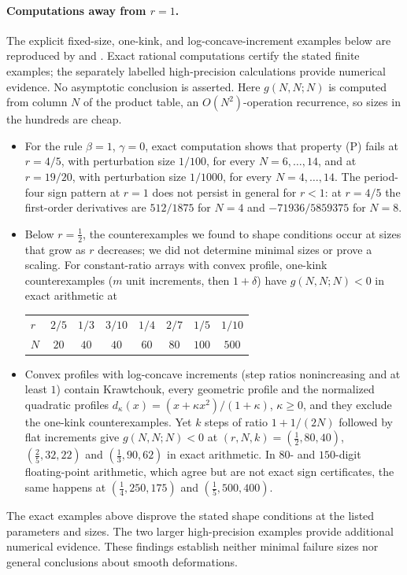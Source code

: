 \documentclass[twoside,10pt]{article}
\numberwithin{equation}{section}
\theoremstyle{slbody}
\theoremstyle{definition}
\theoremstyle{remark}
\begin{document}
\paragraph{Computations away from $r=1$.}
The explicit fixed-size, one-kink, and log-concave-increment examples below are reproduced by  and . Exact rational computations certify the stated finite examples; the separately labelled high-precision calculations provide numerical evidence. No asymptotic conclusion is asserted. Here $g(N,N;N)$ is computed from column $N$ of the product table, an $O(N^2)$-operation recurrence, so sizes in the hundreds are cheap.
\begin{itemize}
\item For the rule $\beta=1$, $\gamma=0$, exact computation shows that property (P) fails at $r=4/5$, with perturbation size $1/100$, for every $N=6,\ldots,14$, and at $r=19/20$, with perturbation size $1/1000$, for every $N=4,\ldots,14$. The period-four sign pattern at $r=1$ does not persist in general for $r<1$: at $r=4/5$ the first-order derivatives are $512/1875$ for $N=4$ and $-71936/5859375$ for $N=8$.
\item Below $r=\tfrac12$, the counterexamples we found to shape conditions occur at sizes that grow as $r$ decreases; we did not determine minimal sizes or prove a scaling. For constant-ratio arrays with convex profile, one-kink counterexamples ($m$ unit increments, then $1+\delta$) have $g(N,N;N)<0$ in exact arithmetic at
\begin{center}
\begin{tabular}{@{}lccccccc@{}}
$r$&$2/5$&$1/3$&$3/10$&$1/4$&$2/7$&$1/5$&$1/10$\\
$N$&$20$&$40$&$40$&$60$&$80$&$100$&$500$
\end{tabular}
\end{center}
\item Convex profiles with log-concave increments (step ratios nonincreasing and at least $1$) contain Krawtchouk, every geometric profile and the normalized quadratic profiles $d_\kappa(x)=(x+\kappa x^2)/(1+\kappa)$, $\kappa\geq0$, and they exclude the one-kink counterexamples. Yet $k$ steps of ratio $1+1/(2N)$ followed by flat increments give $g(N,N;N)<0$ at $(r,N,k)=(\tfrac12,80,40)$, $(\tfrac25,32,22)$ and $(\tfrac13,90,62)$ in exact arithmetic. In $80$- and $150$-digit floating-point arithmetic, which agree but are not exact sign certificates, the same happens at $(\tfrac14,250,175)$ and $(\tfrac15,500,400)$.
\end{itemize}
The exact examples above disprove the stated shape conditions at the listed parameters and sizes. The two larger high-precision examples provide additional numerical evidence. These findings establish neither minimal failure sizes nor general conclusions about smooth deformations.
\end{document}
